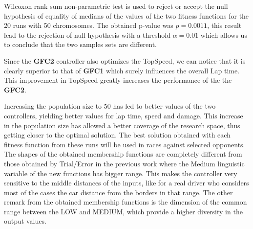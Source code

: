 \documentclass[sigconf]{acmart}
\begin{document}
\begin{table}[ht]
{{\begin{tabular}{|c||c|c|c|c||c|c|c|c|}
			\end{tabular}
		}\label{tab:runsresults}
	}
\end{table}
Wilcoxon rank sum non-parametric test is used to reject or accept the
null hypothesis of equality of medians of the values of the two
fitness functions for the 20 runs with 50 chromosomes. The obtained
p-value was $p =  0.0011$, this result lead to the rejection of null
hypothesis with a threshold $\alpha=0.01$ which allows us to conclude
that the two samples sets are different. 

Since the \textbf{GFC2} controller also optimizes the TopSpeed, we can
notice that it is clearly superior to that of \textbf{GFC1} which
surely influences the overall Lap time. This improvement in TopSpeed
greatly increases the performance of the the \textbf{GFC2}.

Increasing the population size to 50  has led to better values of the
two controllers, yielding better values for lap time, speed and
damage. This increase in the population size has allowed a better
coverage of the research space, thus getting closer to the optimal
solution.  
The best solution obtained with each fitness function from these runs
will be used in races against selected opponents. 
%
The shapes of the obtained membership functions are completely different from
those obtained by Trial/Error in the previous work \cite{evo17}
where the Medium linguistic variable of the new functions has bigger
range. This makes the controller very sensitive to the middle
distances of the inputs, like for a real driver who considers most of
the cases the car distance from the borders in that range. 
The other remark from the obtained  membership functions is the
dimension of the common range between the LOW and MEDIUM, which
provide a higher diversity in the output values. 
\end{document}
